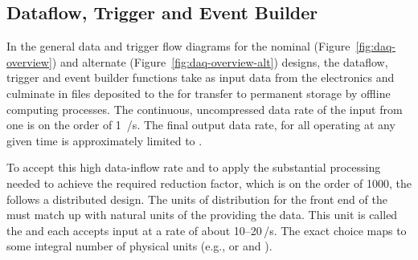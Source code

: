 
\subsection{Dataflow, Trigger and Event Builder}
\label{sec:fd-daq-hlt}


In the general data and trigger flow diagrams for the nominal
(Figure~\ref{fig:daq-overview}) and alternate
(Figure~\ref{fig:daq-overview-alt}) designs, the dataflow, trigger and
event builder functions take as input data from the 
electronics and culminate in files deposited to the  for
transfer to permanent storage by offline computing processes.  
The continuous, uncompressed data rate of the input from one
 is on the order of \SI{1}{\TB/\s}. 
The final output data rate, for all  operating at
any given time is approximately limited to \offsitegbyteps. 

To accept this high data-inflow rate and to apply the substantial
processing needed to achieve the required reduction factor, which is on the 
order of \num{1000}, the  follows a distributed design.
The units of distribution for the front end of the  must match up
with natural units of the  providing the data. 
This unit is called the  and each accepts input at a
rate of about \numrange{10}{20}\,\si{\GB/\s}. 
The exact choice maps to some integral number of physical
 units (e.g.,   or 
 and ).

